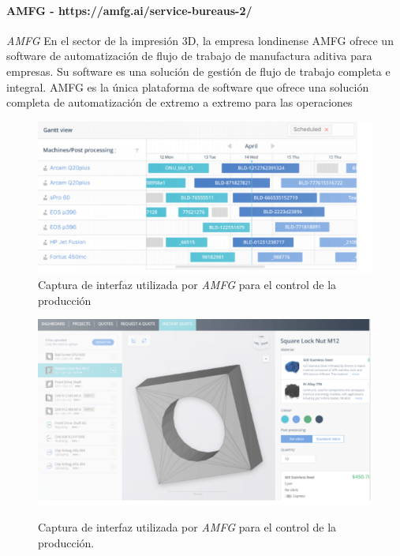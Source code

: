 \paragraph{AMFG - https://amfg.ai/service-bureaus-2/}

\textit{AMFG} En el sector de la impresión 3D, la empresa londinense AMFG ofrece un software de automatización de flujo de trabajo de manufactura aditiva para empresas. Su software es una solución de gestión de flujo de trabajo completa e integral. AMFG es la única plataforma de software que ofrece una solución completa de automatización de extremo a extremo para las operaciones

\begin{figure}[H]
\centering
\includegraphics[scale=1]{images/amfg.png}
\caption{Captura de interfaz utilizada por \textit{AMFG} para el control de la producción}
\label{amfg}
\end{figure}

\begin{figure}[H]
\centering
\includegraphics[scale=0.9]{images/amfg2.png}
\label{amfg2}
\caption{Captura de interfaz utilizada por \textit{AMFG} para el control de la producción.}
\end{figure}

